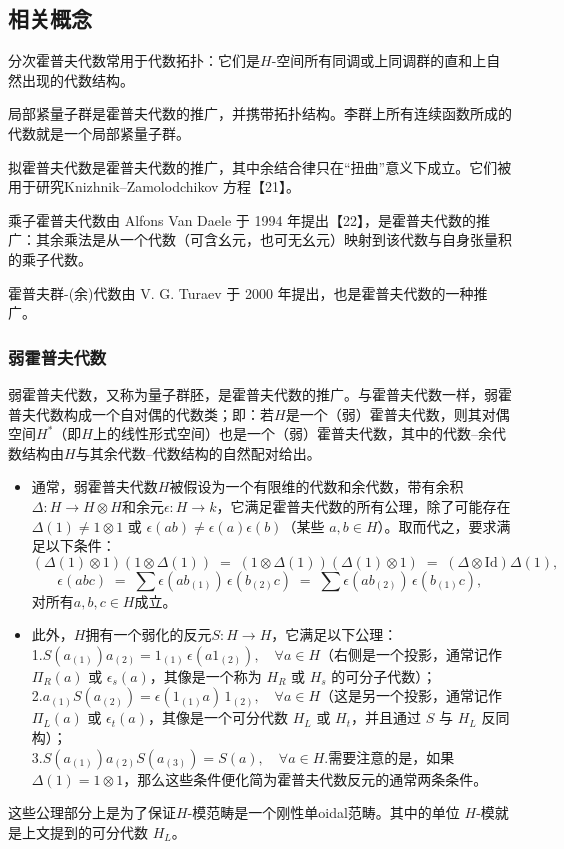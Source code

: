 \subsection{相关概念}
分次霍普夫代数常用于代数拓扑：它们是$H$-空间所有同调或上同调群的直和上自然出现的代数结构。

局部紧量子群是霍普夫代数的推广，并携带拓扑结构。李群上所有连续函数所成的代数就是一个局部紧量子群。

拟霍普夫代数是霍普夫代数的推广，其中余结合律只在“扭曲”意义下成立。它们被用于研究Knizhnik–Zamolodchikov 方程【21】。

乘子霍普夫代数由 Alfons Van Daele 于 1994 年提出【22】，是霍普夫代数的推广：其余乘法是从一个代数（可含幺元，也可无幺元）映射到该代数与自身张量积的乘子代数。

霍普夫群-(余)代数由 V. G. Turaev 于 2000 年提出，也是霍普夫代数的一种推广。
\subsubsection{弱霍普夫代数}
弱霍普夫代数，又称为量子群胚，是霍普夫代数的推广。与霍普夫代数一样，弱霍普夫代数构成一个自对偶的代数类；即：若$H$是一个（弱）霍普夫代数，则其对偶空间$H^*$（即$H$上的线性形式空间）也是一个（弱）霍普夫代数，其中的代数–余代数结构由$H$与其余代数–代数结构的自然配对给出。
\begin{itemize}
\item 通常，弱霍普夫代数$H$被假设为一个有限维的代数和余代数，带有余积$\Delta: H \to H \otimes H$和余元$\epsilon: H \to k$，它满足霍普夫代数的所有公理，除了可能存在 $\Delta(1) \neq 1 \otimes 1$ 或 $\epsilon(ab) \neq \epsilon(a)\epsilon(b)$（某些 $a,b \in H$）。取而代之，要求满足以下条件：
$$
(\Delta(1)\otimes 1)(1\otimes \Delta(1)) \;=\; (1\otimes \Delta(1))(\Delta(1)\otimes 1) \;=\; (\Delta \otimes \mathrm{Id})\Delta(1),~
$$
$$
\epsilon(abc) \;=\; \sum \epsilon(ab_{(1)}) \, \epsilon(b_{(2)}c) \;=\; \sum \epsilon(ab_{(2)}) \, \epsilon(b_{(1)}c),~
$$
对所有$a,b,c \in H$成立。
\item 此外，$H$拥有一个弱化的反元$S: H \to H$，它满足以下公理：\\
1.$S(a_{(1)})a_{(2)} = 1_{(1)} \, \epsilon(a1_{(2)}), \quad \forall a \in H$（右侧是一个投影，通常记作 $\Pi_R(a)$ 或 $\epsilon_s(a)$，其像是一个称为 $H_R$ 或 $H_s$ 的可分子代数）；\\
2.$a_{(1)} S(a_{(2)}) = \epsilon(1_{(1)}a) \, 1_{(2)}, \quad \forall a \in H$（这是另一个投影，通常记作 $\Pi_L(a)$ 或 $\epsilon_t(a)$，其像是一个可分代数 $H_L$ 或 $H_t$，并且通过 $S$ 与 $H_L$ 反同构）；\\
3.$S(a_{(1)})a_{(2)}S(a_{(3)}) = S(a), \quad \forall a \in H$.需要注意的是，如果 $\Delta(1) = 1 \otimes 1$，那么这些条件便化简为霍普夫代数反元的通常两条条件。
\end{itemize}
这些公理部分上是为了保证$H$-模范畴是一个刚性单oidal范畴。其中的单位 $H$-模就是上文提到的可分代数 $H_L$。

